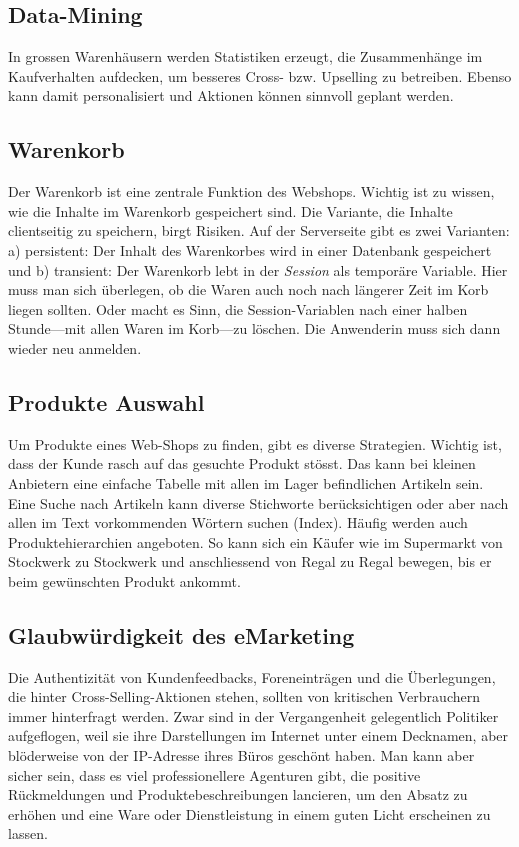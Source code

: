 \subsection{Data-Mining}

In grossen Warenhäusern werden Statistiken erzeugt, die Zusammenhänge im
Kaufverhalten aufdecken, um besseres Cross- bzw. Upselling zu betreiben.
Ebenso kann damit personalisiert und Aktionen können sinnvoll geplant werden.

\subsection{Warenkorb}

Der Warenkorb ist eine zentrale Funktion des Webshops. Wichtig ist zu wissen,
wie die Inhalte im Warenkorb gespeichert sind. Die Variante, die Inhalte
clientseitig zu speichern, birgt Risiken. Auf der Serverseite gibt es zwei
Varianten: a) persistent: Der Inhalt des Warenkorbes wird in einer Datenbank
gespeichert und b) transient: Der Warenkorb lebt in der \emph{Session} als
temporäre Variable. Hier muss man sich überlegen, ob die Waren auch noch
nach längerer Zeit im Korb liegen sollten. Oder macht es Sinn, die
Session-Variablen nach einer halben Stunde---mit allen Waren im
Korb---zu löschen. Die Anwenderin muss sich dann wieder neu anmelden.

\subsection{Produkte Auswahl}

Um Produkte eines Web-Shops zu finden, gibt es diverse Strategien. Wichtig
ist, dass der Kunde rasch auf das gesuchte Produkt stösst. Das kann bei
kleinen Anbietern eine einfache Tabelle mit allen im Lager befindlichen
Artikeln sein. Eine Suche nach Artikeln kann diverse Stichworte
berücksichtigen oder aber nach allen im Text vorkommenden Wörtern
suchen (Index). Häufig werden auch Produktehierarchien angeboten. So
kann sich ein Käufer wie im Supermarkt von Stockwerk zu Stockwerk
und anschliessend von Regal zu Regal bewegen, bis er beim gewünschten
Produkt ankommt.

\subsection{Glaubwürdigkeit des eMarketing}

Die Authentizität von Kundenfeedbacks, Foreneinträgen und die Überlegungen,
die hinter Cross-Selling-Aktionen stehen, sollten von kritischen Verbrauchern
immer hinterfragt werden. Zwar sind in der Vergangenheit gelegentlich
Politiker aufgeflogen, weil sie ihre Darstellungen im Internet unter einem
Decknamen, aber blöderweise von der IP-Adresse ihres Büros geschönt haben.
Man kann aber sicher sein, dass es viel professionellere Agenturen gibt,
die positive Rückmeldungen und Produktebeschreibungen lancieren, um den
Absatz zu erhöhen und eine Ware oder Dienstleistung in einem guten Licht
erscheinen zu lassen.

